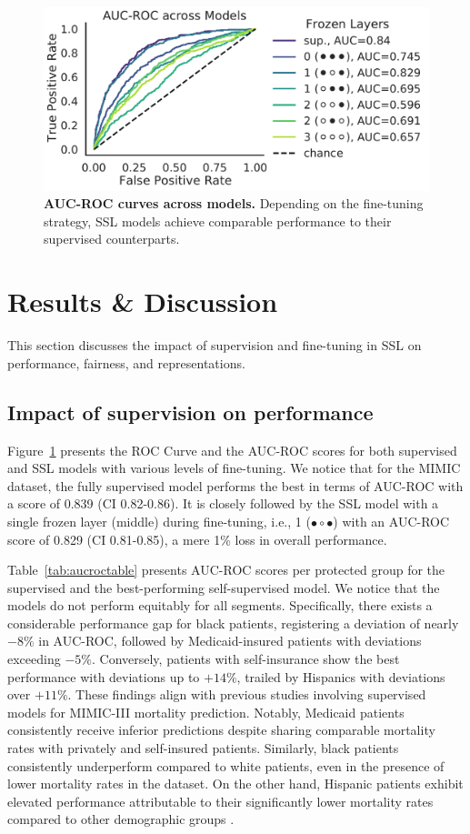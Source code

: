 \documentclass[letterpaper]{article} %
\begin{document}
\begin{figure}[b]
    \centering
    \includegraphics[width=.9\linewidth]{img/AUCROC-noCI.pdf}
    \caption{\textbf{AUC-ROC curves across models.} Depending on the fine-tuning strategy, SSL models achieve comparable performance to their supervised counterparts.}
    \label{fig:AUC-ROC}
    \vspace{-0.3cm}
\end{figure} %
\section{Results \& Discussion}\label{sec:results}
This section discusses the impact of supervision and fine-tuning in SSL on performance, fairness, and representations.

\subsection{Impact of supervision on performance}\label{model-evaluation}
Figure~\ref{fig:AUC-ROC} presents the ROC Curve and the AUC-ROC scores for both supervised and SSL models with various levels of fine-tuning. We notice that for the MIMIC dataset, the fully supervised model performs the best in terms of AUC-ROC with a score of 0.839 (CI 0.82-0.86). It is closely followed by the SSL model with a single frozen layer (middle) during fine-tuning, i.e., 1 ($\bullet\circ\bullet$) with an AUC-ROC score of 0.829 (CI 0.81-0.85), a mere 1\% loss in overall performance.

Table~\ref{tab:aucroctable} presents AUC-ROC scores per protected group for the supervised and the best-performing self-supervised model. We notice that the models do not perform equitably for all segments. Specifically, there exists a considerable performance gap for black patients, registering a deviation of nearly $-8\%$ in AUC-ROC, followed by Medicaid-insured patients with deviations exceeding $-5\%$. Conversely, patients with self-insurance show the best performance with deviations up to $+14\%$, trailed by Hispanics with deviations over $+11\%$. 
These findings align with previous studies involving supervised models for MIMIC-III mortality prediction. Notably, Medicaid patients consistently receive inferior predictions despite sharing comparable mortality rates with privately and self-insured patients. Similarly, black patients consistently underperform compared to white patients, even in the presence of lower mortality rates in the dataset. On the other hand, Hispanic patients exhibit elevated performance attributable to their significantly lower mortality rates compared to other demographic groups \cite{roosli2022peeking}.
\end{document}
